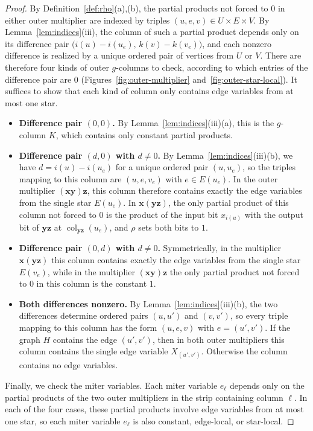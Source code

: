 \documentclass[11pt]{article}
\theoremstyle{definition}
\theoremstyle{remark}
\newcommand{\col}{\operatorname{col}}
\newcommand{\vv}[1]{\mathbf{#1}}
\begin{document}
\begin{proof}
By Definition~\ref{def:rho}(a),(b), the partial products not forced to $0$ in either outer multiplier are indexed by triples $(u,e,v) \in U \times E \times V$. By Lemma~\ref{lem:indices}(iii), the column of such a partial product depends only on its difference pair
$\bigl(i(u)-i(u_e),\,k(v)-k(v_e)\bigr)$, and each nonzero difference is realized by a unique ordered pair of vertices from $U$ or $V$.
There are therefore four kinds of outer $g$-columns to check, according to which entries of the difference pair are $0$ (Figures~\ref{fig:outer-multiplier} and~\ref{fig:outer-star-local}). It suffices to show that each kind of column only contains edge variables from at most one star.
\begin{itemize}
\item \textbf{Difference pair $(0,0)$.} By Lemma~\ref{lem:indices}(iii)(a), this is the $g$-column $K$, which contains only constant
partial products.
\item \textbf{Difference pair $(d,0)$ with $d\ne0$.} By Lemma~\ref{lem:indices}(iii)(b), we have $d=i(u)-i(u_e)$ for a unique ordered pair
$(u,u_e)$, so the triples mapping to this column are $(u,e,v_e)$ with $e\in E(u_e)$. In the outer multiplier $(\vv{x}\vv{y})\vv{z}$,
this column therefore contains exactly the edge variables from the single star $E(u_e)$. In $\vv{x}(\vv{y}\vv{z})$, the only partial product of this column not forced to $0$ is the product of the input bit $x_{i(u)}$
with the output bit of $\vv{y}\vv{z}$ at $\col_{\vv{yz}}(u_e)$, and $\rho$ sets both bits to $1$.
\item \textbf{Difference pair $(0,d)$ with $d\ne0$.} Symmetrically, in the multiplier $\vv{x}(\vv{y}\vv{z})$ this column contains exactly the edge variables from the single star $E(v_e)$, while in the multiplier $(\vv{x}\vv{y})\vv{z}$ the only partial product not forced to $0$ in this column is the constant $1$.
\item \textbf{Both differences nonzero.} By Lemma~\ref{lem:indices}(iii)(b), the two differences determine ordered pairs $(u,u')$ and $(v,v')$,
so every triple mapping to this column has the form $(u,e,v)$ with $e=(u',v')$. If the graph $H$ contains the edge $(u',v')$, then in both outer multipliers this column contains the single edge variable $X_{(u',v')}$. Otherwise the column contains no edge variables.
\end{itemize}

Finally, we check the miter variables. Each miter variable $e_\ell$ depends only on the partial products of the two outer multipliers in the strip containing column $\ell$. In each of the four cases, these partial products involve edge variables from at most one star, so each miter variable $e_\ell$ is also constant, edge-local, or star-local.
\end{proof}
\end{document}
